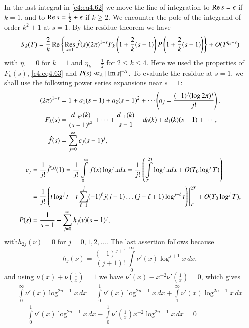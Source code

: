 In the last integral in \eqref{c4:eq4.62} we move the line of
integration to $\operatorname{Re} s = \epsilon$ if $k=1$, and to $\operatorname{Re} s =
\frac{1}{2} + \epsilon$ if $k \geq 2$. We encounter the pole of the
integrand of order $k^2 +1$ at $s=1$. By the residue theorem we have
{\fontsize{10}{12}\selectfont
$$
S_k (T) = \frac{2}{k} \operatorname{Re} \left\{ \mathop{\operatorname{Res}}_{s=1} \hat{f} (s) (2
\pi)^{1-s} F_k \left(1+ \frac{2}{k} (s-1) \right) P\left(1+
\frac{2}{k} (s-1) \right) \right\} + O(T^{\eta_k+\epsilon})
$$}
with $\eta_1=0$ for $k=1$ and $\eta_k = \frac{1}{2}$ for $2 \leq k
\leq 4$. Here we used the properties of $F_k (s)$, \eqref{c4:eq4.63}
and $P(s) \ll_A |\operatorname{Im} s|^{-A}$. To evaluate the residue at $s=1$, we
shall use the following power series expansions near $s=1$:
\begin{align}
  (2 \pi)^{1-s} & = 1+ a_1 (s-1)+ a_2 (s-1)^2 + \cdots \left(a_j
  =\frac{(-1)^j(\log 2 \pi)^j}{j!} \right), \notag\\
  F_k (s) & = \frac{d_{-k^2}(k)}{(s-1)^{k^2}} + \cdots +
  \frac{d_{-1}(k)}{s-1} + d_0 (k) + d_1 (k) (s-1) + \cdots , \notag\\
  \hat{f} (s) & = \sum_{j=0}^\infty c_j (s-1)^j, \label{c4:eq4.64}
\end{align}
{\fontsize{9}{11}\selectfont
\begin{align*}
  c_j & = \frac{1}{j!} \hat{f}^{(j)}(1) = \frac{1}{j!}
  \int\limits_0^\infty f(x) \log^j x dx = \frac{1}{j!}
  \left(\int\limits_T^{2T} \log^j x dx + O(T_0 \log^j T) \right)\notag\\
  & = \frac{1}{j!} \left(t \log^j t+ t \sum_{\ell=1}^j (-1)^\ell j
  (j-1) \ldots (j - \ell +1)\log^{j-\ell} t\right) \Bigg|_T^{2T} +
  O(T_0 \log ^j T),\notag\\
  P(s) & = \frac{1}{s-1} + \sum^\infty_{j=0} h_j (\nu) (s-1)^j,\notag
\end{align*}}
with\pageoriginale $h_{2j}(\nu)=0$ for $j= 0, 1, 2, \ldots$. The last
assertion follows because
$$
h_j (\nu) = \frac{(-1)^{j+1}}{(j+1)!} \int\limits_0^\infty \nu' (x)
\log^{j+1} x\, dx,
$$
and using $\nu(x) + \nu \left(\frac{1}{x} \right)=1$ we have $\nu' (x)
- x^{-2} \nu' \left(\frac{1}{x}\right)=0$, which gives 
\begin{align*}
  \int\limits_0^\infty \nu' (x) \log^{2n-1} x \, dx  =
  \int\limits_0^1 \nu' (x) \log^{2n-1} x\, dx + \int\limits_1^\infty
  \nu' (x) \log ^{2n-1} x \, dx\\
   = \int\limits_0^1 \nu' (x) \log^{2n-1} x\, dx - \int\limits_0^1
  \nu' \left(\frac{1}{x}\right) x^{-2} \log^{2n-1} x\, dx = 0
\end{align*}
